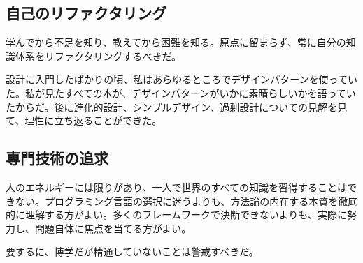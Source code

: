 \begin{content}
\subsection{自己のリファクタリング}

学んでから不足を知り、教えてから困難を知る。原点に留まらず、常に自分の知識体系をリファクタリングするべきだ。

設計に入門したばかりの頃、私はあらゆるところでデザインパターンを使っていた。私が見たすべての本が、デザインパターンがいかに素晴らしいかを語っていたからだ。後に進化的設計、シンプルデザイン、過剰設計についての見解を見て、理性に立ち返ることができた。

\subsection{専門技術の追求}

人のエネルギーには限りがあり、一人で世界のすべての知識を習得することはできない。プログラミング言語の選択に迷うよりも、方法論の内在する本質を徹底的に理解する方がよい。多くのフレームワークで決断できないよりも、実際に努力し、問題自体に焦点を当てる方がよい。

要するに、博学だが精通していないことは警戒すべきだ。

\end{content}
